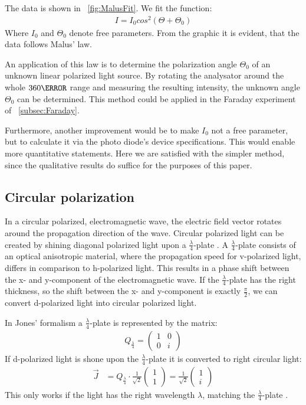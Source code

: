\documentclass[a4paper,10pt,twocolumn]{article}
\newcommand{\quaterWavePlate}{$\frac{\lambda}{4}$-plate }
\begin{document}
    The data is shown in ~\autoref{fig:MalusFit}.
    We fit the function:
    \begin{align}
        \label{eq:malusFit}
        I = I_0 cos^2(\Theta + \Theta_0)
    \end{align}
     Where $I_0$ and $\Theta_0$ denote free parameters.
    From the graphic it is evident, that the data follows Malus' law.
    
    An application of this law is to determine the polarization angle $\Theta_0$ of an unknown
    linear polarized light source.
    By rotating the analysator around the whole $360\degree$ range and measuring the
    resulting intensity, the unknown angle $\Theta_0$ can be determined.
    This method could be applied in the Faraday experiment of ~\autoref{subsec:Faraday}.
    
    Furthermore, another improvement would be to make $I_0$ not a free parameter, but to calculate it
    via the photo diode's device specifications.
    This would enable more quantitative statements.
    Here we are satisfied with the simpler method,
    since the qualitative results do suffice for the purposes of this paper.
    
    \subsection{Circular polarization}
    
    In a circular polarized, electromagnetic wave, the electric field vector rotates around the
    propagation direction of the wave.
    Circular polarized light can be created by shining diagonal polarized light upon a \quaterWavePlate.
    A \quaterWavePlate consists of an optical anisotropic material, where the propagation speed for
    v-polarized light, differs in comparison to h-polarized light.
    This results in a phase shift between the x- and y-component of the electromagnetic wave.
    If the \quaterWavePlate has the right thickness, so the shift between the x- and y-component
    is exactly $\frac{\pi}{2}$, we can convert d-polarized light into circular polarized light.
    
    In Jones' formalism a \quaterWavePlate is represented by the matrix:
    \begin{align*}
        Q_{\frac{\lambda}{4}} = \begin{pmatrix} 1 & 0 \\ 0 & i \end{pmatrix} 
    \end{align*}
    If d-polarized light is shone upon the \quaterWavePlate it is converted to right circular light:
    \begin{align*}
        \vec{J} &= Q_{\frac{\lambda}{4}} \cdot \frac{1}{\sqrt {2}} \begin{pmatrix} 1 \\ 1 \end{pmatrix} =
        \frac{1}{\sqrt {2}} \begin{pmatrix} 1 \\ i \end{pmatrix}
    \end{align*}
    This only works if the light has the right wavelength $\lambda$, matching the 
    \quaterWavePlate.
    
\end{document}
